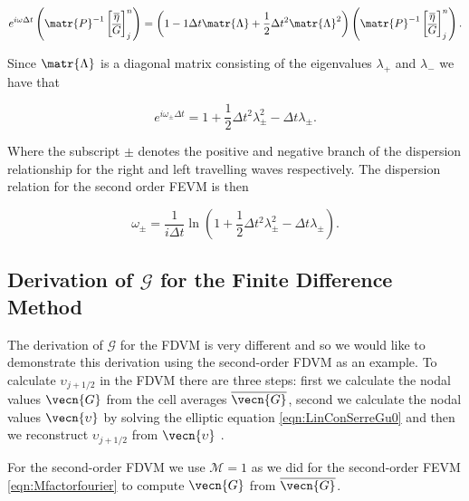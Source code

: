 \begin{equation*}
e^{i\omega \Delta t} \left(\matr{P}^{-1} \begin{bmatrix}
\overline{\eta} \\ \overline{G}
\end{bmatrix}^{n}_j  \right)= \left(1 -1\Delta t \matr{\Lambda}  + \frac{1}{2}\Delta t^2 \matr{\Lambda}^2  \right)  \left(\matr{P}^{-1} \begin{bmatrix}
\overline{\eta} \\ \overline{G}
\end{bmatrix}^{n}_j  \right).
\end{equation*}

Since $\matr{\Lambda}$ is a diagonal matrix consisting of the eigenvalues $\lambda_+$ and $\lambda_-$ we have that

\begin{equation*}
e^{i\omega_\pm \Delta t} = 1 + \frac{1}{2}\Delta t^2 \lambda_{\pm}^2  -\Delta t\lambda_{\pm}. 
\end{equation*}

Where the subscript $\pm$ denotes the positive and negative branch of the dispersion relationship for the right and left travelling waves respectively. The dispersion relation for the second order FEVM is then

\begin{equation}
\label{eqn:DispersionRelationSecondOrder}
\omega_\pm = \frac{1}{i \Delta t} \ln \left(1 + \frac{1}{2}\Delta t^2 \lambda_\pm^2  -\Delta t\lambda_\pm\right).
\end{equation}
 
 \subsection{Derivation of $\mathcal{G}$ for the Finite Difference Method}
The derivation of $\mathcal{G}$ for the FDVM is very different and so we would like to demonstrate this derivation using the second-order FDVM as an example. To calculate $\upsilon_{j+1/2}$ in the FDVM there are three steps: first we calculate the nodal values $\vecn{G}$ from the cell averages $\overline{\vecn{G}}$, second we calculate the nodal values $\vecn{\upsilon}$ by solving the elliptic equation \eqref{eqn:LinConSerreGu0} and then we reconstruct $\upsilon_{j+1/2}$ from $\vecn{\upsilon}$ . 

For the second-order FDVM we use $\mathcal{M} =1$ as we did for the second-order FEVM \eqref{eqn:Mfactorfourier} to compute $\vecn{G}$ from $\overline{\vecn{G}}$.

